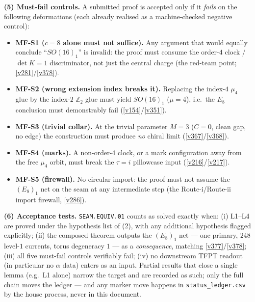 \documentclass[11pt,a4paper]{article}
\newcommand{\Z}{\mathbb Z}
\begin{document}
\par\smallskip\noindent\textbf{(5) Must-fail controls.} A submitted proof is accepted only if it
\emph{fails} on the following deformations (each already realised as a machine-checked negative
control):
\begin{itemize}
\item \textbf{MF-S1 ($c=8$ alone must not suffice).} Any argument that would equally conclude
  ``$SO(16)_1$'' is invalid: the proof must consume the order-$4$ clock / $\det K=1$
  discriminator, not just the central charge (the red-team point; \vref{v281}/\vref{v378}).
\item \textbf{MF-S2 (wrong extension index breaks it).} Replacing the index-$4$ $\mu_4$ glue by
  the index-$2$ $\Z_2$ glue must yield $SO(16)_1$ ($\mu=4$), i.e.\ the $E_8$
  conclusion must demonstrably fail (\vref{v154}/\vref{v351}).
\item \textbf{MF-S3 (trivial collar).} At the trivial parameter $M=3$ ($C=0$, clean gap, no
  edge) the construction must produce \emph{no} chiral limit (\vref{v367}/\vref{v368}).
\item \textbf{MF-S4 (marks).} A non-order-$4$ clock, or a mark configuration away from the free
  $\mu_4$ orbit, must break the $\tau=i$ pillowcase input (\vref{v216}/\vref{v217}).
\item \textbf{MF-S5 (firewall).} No circular import: the proof must not assume the $(E_8)_1$ net
  on the seam at any intermediate step (the Route-i/Route-ii import firewall, \vref{v286}).
\end{itemize}

\par\smallskip\noindent\textbf{(6) Acceptance tests.} \texttt{SEAM.EQUIV.01} counts as solved
exactly when: (i) L1--L4 are proved under the hypothesis list of (2), with any additional
hypothesis flagged explicitly; (ii) the composed theorem outputs the $(E_8)_1$ net --- one
primary, $248$ level-$1$ currents, torus degeneracy $1$ --- as a \emph{consequence}, matching
\vref{v377}/\vref{v378}; (iii) all five must-fail controls verifiably fail; (iv) no downstream
TFPT readout (in particular no $\alpha$ data) enters as an input. Partial results that close a
single lemma (e.g.\ L1 alone) narrow the target and are recorded as such; only the full chain
moves the ledger --- and any marker move happens in \texttt{status\_ledger.csv} by the house
process, never in this document.

\end{document}
